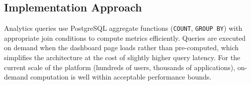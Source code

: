 \subsection{Implementation Approach}

Analytics queries use PostgreSQL aggregate functions (\texttt{COUNT}, \texttt{GROUP BY}) with appropriate join conditions to compute metrics efficiently. Queries are executed on demand when the dashboard page loads rather than pre-computed, which simplifies the architecture at the cost of slightly higher query latency. For the current scale of the platform (hundreds of users, thousands of applications), on-demand computation is well within acceptable performance bounds.

